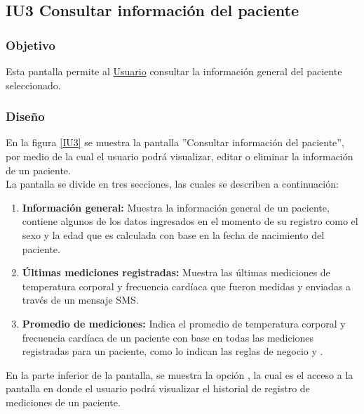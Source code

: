 \subsection{IU3 Consultar información del paciente}

\subsubsection{Objetivo}
	
Esta pantalla permite al \hyperlink{actor:usuario}{Usuario} consultar la información general del paciente seleccionado.

\subsubsection{Diseño}
En la figura \ref{IU3} se muestra la pantalla ''Consultar información del paciente'', por medio de la cual el usuario podrá
visualizar, editar o eliminar la información de un paciente.\\

La pantalla se divide en tres secciones, las cuales se describen a continuación:

\begin{enumerate}
	\item \textbf{Información general:} Muestra la información general de un paciente, contiene algunos de los datos ingresados en el momento de su registro como el sexo y la edad que es calculada con base en la fecha de nacimiento del paciente.
	
	\item \textbf{Últimas mediciones registradas:} Muestra las últimas mediciones de temperatura corporal y frecuencia cardíaca que fueron medidas y enviadas a través de un mensaje SMS.
	
	\item \textbf{Promedio de mediciones:} Indica el promedio de temperatura corporal y frecuencia cardíaca de un paciente con base en todas las mediciones registradas para un paciente, como lo indican las reglas de negocio  y .
\end{enumerate}
    
 En la parte inferior de la pantalla, se muestra la opción \btnMonitoreo{}, la cual es el acceso a la pantalla en donde el usuario podrá visualizar el historial de registro de mediciones de un paciente.
 
